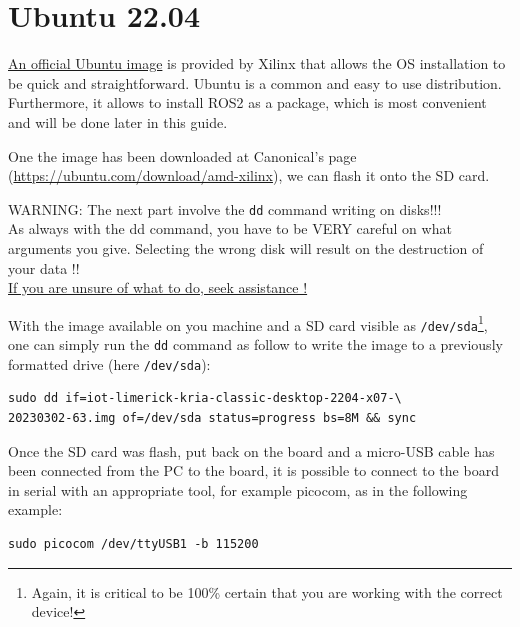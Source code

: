 \documentclass[10pt]{article}
\begin{document}
\section{Ubuntu 22.04}
\label{sec:ubuntu-22.04}
\href{https://ubuntu.com/download/amd-xilinx}{An official Ubuntu image} is provided by Xilinx that allows the OS installation to be quick and
straightforward. Ubuntu is a common and easy to use distribution. Furthermore, it allows to install ROS2 as a package, which is most convenient
and will be done later in this guide.

One the image has been downloaded at Canonical's page (\url{https://ubuntu.com/download/amd-xilinx}), we can flash it onto the SD card.

\begin{tcolorbox}[colback=red!5!white,colframe=red!75!black]
  WARNING: The next part involve the \verb|dd| command writing on disks!!! \\
  As always with the dd command, you have to be VERY careful on what arguments you give. Selecting the wrong disk will result on the destruction of your data !! \\
  \underline{If you are unsure of what to do, seek assistance !}
\end{tcolorbox}


With the image available on you machine and a SD card visible as \verb|/dev/sda|\footnote{Again, it is critical to be 100\% certain that you are working with the correct device!}, one can simply run the \verb|dd| command as follow to write the image to a previously formatted drive (here \verb|/dev/sda|):
\begin{tcolorbox}
\begin{verbatim}
sudo dd if=iot-limerick-kria-classic-desktop-2204-x07-\
20230302-63.img of=/dev/sda status=progress bs=8M && sync
\end{verbatim}
\end{tcolorbox}

Once the SD card was flash, put back on the board and a micro-USB cable has been connected from the PC to the board, it is possible to
connect to the board in serial with an appropriate tool, for example picocom, as in the following example:
\begin{tcolorbox}
\begin{verbatim}
sudo picocom /dev/ttyUSB1 -b 115200
\end{verbatim}
\end{tcolorbox}
\end{document}
